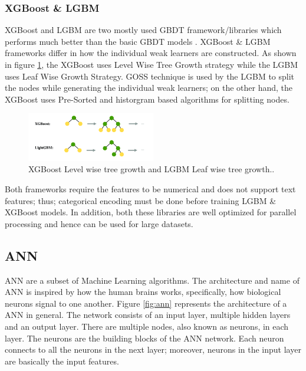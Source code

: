 \documentclass[twoside,11pt,a4paper]{article}
\begin{document}
\subsubsection{\acf{XGBoost} \& \acf{LGBM}} \label{sec:xgboost_lgbm}
\acf{XGBoost}\citep{chen2016xgboost} and \acf{LGBM}\citep{ke2017lightgbm} are two mostly used \acf{GBDT} framework/libraries which performs much better than the basic \acs{GBDT} models \citep{machado2019lightgbm}. \acf{XGBoost} \& \acs{LGBM} frameworks differ in how the individual weak learners are constructed. As shown in figure \ref{fig:lgbm_xgboost_tree_growth}, the \acs{XGBoost} uses Level Wise Tree Growth strategy while the \acs{LGBM} uses Leaf Wise Growth Strategy. \acf{GOSS} technique is used by the \acs{LGBM} to split the nodes while generating the individual weak learners; on the other hand, the \acs{XGBoost} uses Pre-Sorted and historgram based algorithms for splitting nodes.

\begin{figure}[ht]
	\centering
	\includegraphics[width=0.5\textwidth]{lgbm_xgboost_tree_growth}
	\caption[\acs{XGBoost} Level wise tree growth and \acs{LGBM} Leaf wise tree growth.]{\acs{XGBoost} Level wise tree growth and \acs{LGBM} Leaf wise tree growth.\cite{rezazadeh2020generalized}.}
	\label{fig:lgbm_xgboost_tree_growth}
\end{figure}

Both frameworks require the features to be numerical and does not support text features; thus; categorical encoding must be done before training \acs{LGBM} \& \acs{XGBoost} models.
In addition, both these libraries are well optimized for parallel processing and hence can be used for large datasets.

\subsection{\acf{ANN}}
\acs{ANN} are a subset of Machine Learning algorithms. The  architecture and name of \acs{ANN} is inspired by how the human brains works, specifically, how biological neurons signal to one another\citep{ibm2022neural}. Figure \ref{fig:ann} represents the architecture of a \acs{ANN} in general. The network consists of an input layer, multiple hidden layers and an output layer. There are multiple nodes, also known as neurons, in each layer. The neurons are the building blocks of the \acs{ANN} network. Each neuron connects to all the neurons in the next layer; moreover, neurons in the input layer are basically the input features.
\end{document}
